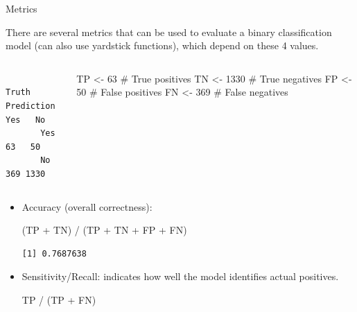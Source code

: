 \documentclass[
  10pt,
  ignorenonframetext,
]{beamer}
\newenvironment{Shaded}{\begin{snugshade}}{\end{snugshade}}
\newcommand{\CommentTok}[1]{\textcolor[rgb]{0.37,0.37,0.37}{#1}}
\newcommand{\DecValTok}[1]{\textcolor[rgb]{0.68,0.00,0.00}{#1}}
\newcommand{\NormalTok}[1]{\textcolor[rgb]{0.00,0.23,0.31}{#1}}
\newcommand{\OtherTok}[1]{\textcolor[rgb]{0.00,0.23,0.31}{#1}}
\newcommand{\SpecialCharTok}[1]{\textcolor[rgb]{0.37,0.37,0.37}{#1}}
\begin{document}
\begin{frame}[fragile]{Metrics}
\label{metrics}
\scriptsize

There are several metrics that can be used to evaluate a binary
classification model (can also use yardstick functions), which depend on
these 4 values.

\begin{columns}[T]
\begin{column}{0.48\textwidth}
\begin{verbatim}
          Truth
Prediction  Yes   No
       Yes   63   50
       No   369 1330
\end{verbatim}
\end{column}

\begin{column}{0.48\textwidth}
\begin{Shaded}
\begin{Highlighting}[]
\NormalTok{TP }\OtherTok{\textless{}{-}} \DecValTok{63} \CommentTok{\# True positives}
\NormalTok{TN }\OtherTok{\textless{}{-}} \DecValTok{1330} \CommentTok{\# True negatives}
\NormalTok{FP }\OtherTok{\textless{}{-}} \DecValTok{50} \CommentTok{\# False positives}
\NormalTok{FN }\OtherTok{\textless{}{-}} \DecValTok{369} \CommentTok{\# False negatives}
\end{Highlighting}
\end{Shaded}
\end{column}
\end{columns}

\scriptsize

\begin{itemize}
\item
  Accuracy (overall correctness):

\begin{Shaded}
\begin{Highlighting}[]
\NormalTok{(TP }\SpecialCharTok{+}\NormalTok{ TN) }\SpecialCharTok{/}\NormalTok{ (TP }\SpecialCharTok{+}\NormalTok{ TN }\SpecialCharTok{+}\NormalTok{ FP }\SpecialCharTok{+}\NormalTok{ FN)}
\end{Highlighting}
\end{Shaded}

\begin{verbatim}
[1] 0.7687638
\end{verbatim}
\item
  Sensitivity/Recall: indicates how well the model identifies actual
  positives.

\begin{Shaded}
\begin{Highlighting}[]
\NormalTok{TP }\SpecialCharTok{/}\NormalTok{ (TP }\SpecialCharTok{+}\NormalTok{ FN)}
\end{Highlighting}
\end{Shaded}


\end{itemize}
\end{frame}
\end{document}
